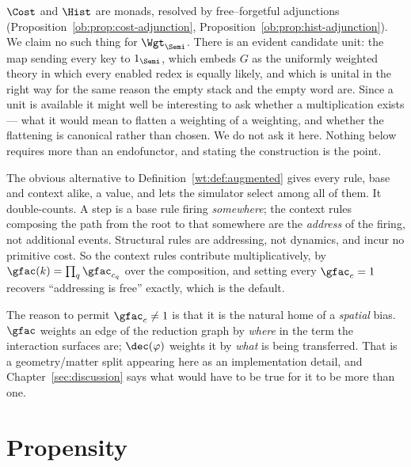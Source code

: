 \begin{remark}
\label{wt:rmk:notamonad}
$\Cost$ and $\Hist$ are monads, resolved by free--forgetful adjunctions
(Proposition~\ref{ob:prop:cost-adjunction}, Proposition~\ref{ob:prop:hist-adjunction}).
We claim no such thing for $\Wgt_{\Semi}$. There is an evident candidate unit: the map
sending every key to $1_{\Semi}$, which embeds $G$ as the uniformly weighted theory in
which every enabled redex is equally likely, and which is unital in the right way for the
same reason the empty stack and the empty word are. Since a unit is available it might
well be interesting to ask whether a multiplication exists --- what it would mean to
flatten a weighting of a weighting, and whether the flattening is canonical rather than
chosen. We do not ask it here. Nothing below requires more than an endofunctor, and
stating the construction is the point.
\end{remark}

\begin{remark}
\label{wt:rmk:geometric}
The obvious alternative to Definition~\ref{wt:def:augmented} gives every rule, base and
context alike, a value, and lets the simulator select among all of them. It
double-counts. A step is a base rule firing \emph{somewhere}; the context rules composing
the path from the root to that somewhere are the \emph{address} of the firing, not
additional events. Structural rules are addressing, not dynamics, and incur no primitive
cost. So the context rules contribute multiplicatively, by
$\gfac(k) = \prod_q \gfac_{c_q}$ over the composition, and setting every $\gfac_c = 1$
recovers ``addressing is free'' exactly, which is the default.

The reason to permit $\gfac_c \neq 1$ is that it is the natural home of a \emph{spatial}
bias. $\gfac$ weights an edge of the reduction graph by \emph{where} in the term the
interaction surfaces are; $\dec(\varphi)$ weights it by \emph{what} is being transferred.
That is a geometry/matter split appearing here as an implementation detail, and
Chapter~\ref{sec:discussion} says what would have to be true for it to be more than one.
\end{remark}

\section{Propensity}
\label{wt:sec:propensity}

